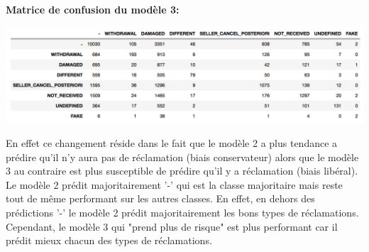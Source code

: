 \textbf{Matrice de confusion du modèle 3:}
\vspace{0.5cm}
\begin{center}
\includegraphics[scale=0.5]{assets/confmat2} 
\end{center}
\vspace{0.5cm}

En effet ce changement réside dans le fait que le modèle 2 a plus tendance a prédire qu'il
n'y aura pas de réclamation (biais conservateur) alors que le modèle 3 au contraire est plus 
susceptible de prédire qu'il y a réclamation (biais libéral). Le modèle 2 prédit 
majoritairement '-' qui est la classe majoritaire mais reste tout de même performant
sur les autres classes. En effet, en dehors des prédictions '-' le modèle 2 prédit 
majoritairement les bons types de réclamations. Cependant, le modèle 3 qui "prend plus de 
risque" est plus performant car il prédit mieux chacun des types de réclamations.

